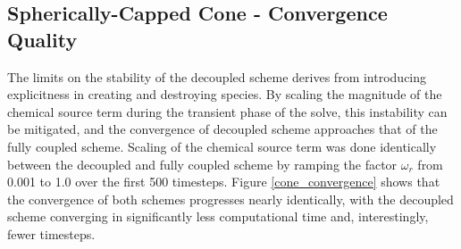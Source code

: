 \subsection{Spherically-Capped Cone - Convergence Quality}

The limits on the stability of the decoupled scheme derives from introducing
explicitness in creating and destroying species.  By scaling the magnitude of
the chemical source term during the transient phase of the solve, this
instability can be mitigated, and the convergence of decoupled scheme approaches
that of the fully coupled scheme. Scaling of the chemical source term was done
identically between the decoupled and fully coupled scheme by ramping the factor
$\omega_r$ from 0.001 to 1.0 over the first 500 timesteps. Figure
\ref{cone_convergence} shows that the convergence of both schemes progresses
nearly identically, with the decoupled scheme converging in significantly less
computational time and, interestingly, fewer timesteps.
